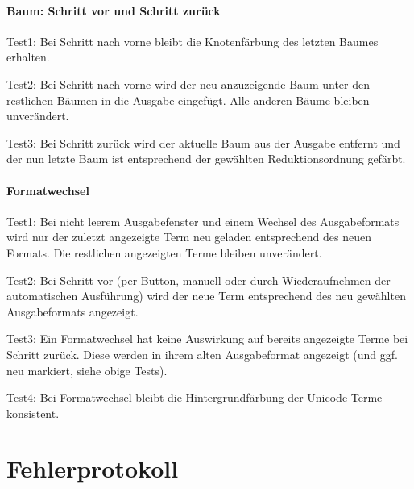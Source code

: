 \documentclass[parskip=full,11pt,openany]{scrreprt}
\begin{document}
\subsubsection{Baum: Schritt vor und Schritt zurück}
Test1: Bei Schritt nach vorne bleibt die Knotenfärbung des letzten Baumes erhalten.

Test2: Bei Schritt nach vorne wird der neu anzuzeigende Baum unter den restlichen Bäumen in die Ausgabe eingefügt. Alle anderen Bäume bleiben unverändert.

Test3: Bei Schritt zurück wird der aktuelle Baum aus der Ausgabe entfernt und der nun letzte Baum ist entsprechend der gewählten Reduktionsordnung gefärbt.

\subsubsection{Formatwechsel}
Test1: Bei nicht leerem Ausgabefenster und einem Wechsel des Ausgabeformats wird nur der zuletzt angezeigte Term neu geladen entsprechend des neuen Formats. Die restlichen angezeigten Terme bleiben unverändert.

Test2: Bei Schritt vor (per Button, manuell oder durch Wiederaufnehmen der automatischen Ausführung) wird der neue Term entsprechend des neu gewählten Ausgabeformats angezeigt. 

Test3: Ein Formatwechsel hat keine Auswirkung auf bereits angezeigte Terme bei Schritt zurück. Diese werden in ihrem alten Ausgabeformat angezeigt (und ggf. neu markiert, siehe obige Tests).

Test4: Bei Formatwechsel bleibt die Hintergrundfärbung der Unicode-Terme konsistent. %


\chapter{Fehlerprotokoll}
\end{document}
